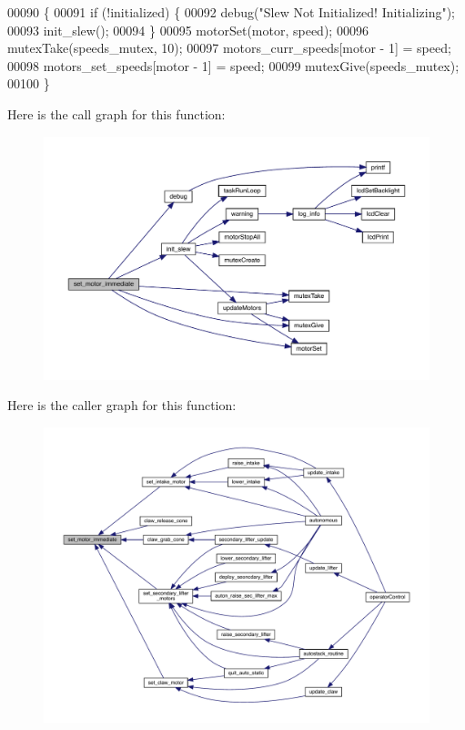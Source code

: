 \begin{DoxyCode}
00090                                                \{
00091   \textcolor{keywordflow}{if} (!initialized) \{
00092     debug(\textcolor{stringliteral}{"Slew Not Initialized! Initializing"});
00093     init_slew();
00094   \}
00095   motorSet(motor, speed);
00096   mutexTake(speeds_mutex, 10);
00097   motors_curr_speeds[motor - 1] = speed;
00098   motors_set_speeds[motor - 1] = speed;
00099   mutexGive(speeds_mutex);
00100 \}
\end{DoxyCode}
Here is the call graph for this function\+:
\nopagebreak
\begin{figure}[H]
\begin{center}
\leavevmode
\includegraphics[width=350pt]{slew_8h_a9f8b8ae577ef938622024545711f0151_cgraph}
\end{center}
\end{figure}
Here is the caller graph for this function\+:
\nopagebreak
\begin{figure}[H]
\begin{center}
\leavevmode
\includegraphics[width=350pt]{slew_8h_a9f8b8ae577ef938622024545711f0151_icgraph}
\end{center}
\end{figure}
\mbox{\label{slew_8h_a7dff2b79dffe55fb936d977594d7c01d}} 
